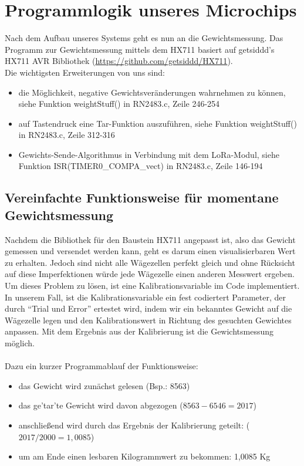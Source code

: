 \section{Programmlogik unseres Microchips}
Nach dem Aufbau unseres Systems geht es nun an die Gewichtsmessung. Das Programm zur Gewichtsmessung mittels dem HX711 basiert auf getsiddd's HX711 AVR Bibliothek (\url{https://github.com/getsiddd/HX711}).\\ 
Die wichtigsten Erweiterungen von uns sind:\\
\begin{itemize}
    \item die Möglichkeit, negative Gewichtsveränderungen wahrnehmen zu können, siehe Funktion weightStuff() in RN2483.c, Zeile 246-254
    \item auf Tastendruck eine Tar-Funktion auszuführen, siehe Funktion weightStuff() in RN2483.c, Zeile 312-316
    \item Gewichts-Sende-Algorithmus in Verbindung mit dem LoRa-Modul, siehe Funktion ISR(TIMER0\_COMPA\_vect) in RN2483.c, Zeile 146-194
\end{itemize}
\subsection{Vereinfachte Funktionsweise für momentane Gewichtsmessung}
\noindent
Nachdem die Bibliothek für den Baustein HX711 angepasst ist, also das Gewicht gemessen und versendet werden kann, geht es darum einen visualisierbaren Wert zu erhalten. Jedoch sind nicht alle Wägezellen perfekt gleich und ohne Rücksicht auf diese Imperfektionen würde jede Wägezelle einen anderen Messwert ergeben. 
Um dieses Problem zu lösen, ist eine Kalibrationsvariable im Code implementiert. In unserem Fall, ist die Kalibrationsvariable ein fest codiertert Parameter, der durch ``Trial und Error'' ertestet wird, indem wir ein bekanntes Gewicht auf die Wägezelle legen und den Kalibrationswert in Richtung des gesuchten Gewichtes anpassen. Mit dem Ergebnis aus der Kalibrierung ist die Gewichtsmessung möglich.\\
\\
Dazu ein kurzer Programmablauf der Funktionsweise:
\begin{itemize}
    \item das Gewicht wird zunächst gelesen (Bsp.: 8563)
    \item das ge'tar'te Gewicht wird davon abgezogen ($8563 - 6546 = 2017$)
    \item anschließend wird durch das Ergebnis der Kalibrierung geteilt: ($2017 / 2000 = 1,0085$)
    \item um am Ende einen lesbaren Kilogrammwert zu bekommen: 1,0085 Kg
\end{itemize}
